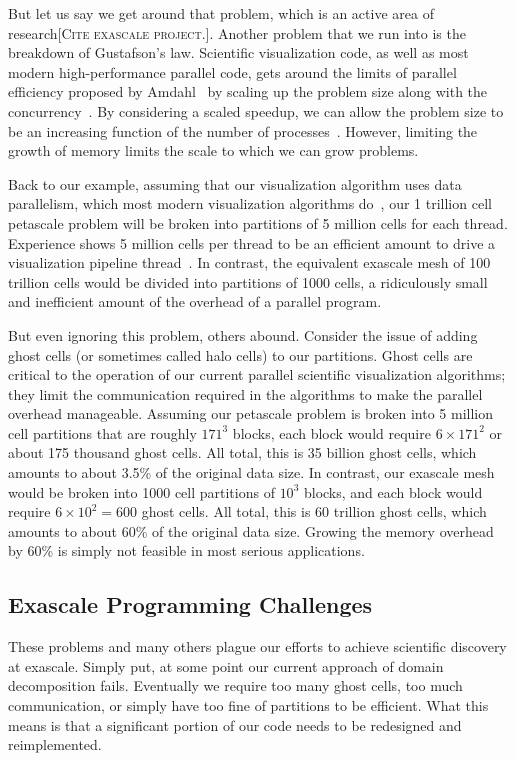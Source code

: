 \documentclass[conference]{IEEEtran}
\newcommand*{\lcite}[1]{~\cite{#1}}
\newcommand{\fix}[1]{{\color{red}\textsc{[#1]}}}
\begin{document}
But let us say we get around that problem, which is an active area of
research\fix{Cite exascale project.}.  Another problem that we run into is
the breakdown of Gustafson's law.  Scientific visualization code, as well
as most modern high-performance parallel code, gets around the limits of
parallel efficiency proposed by Amdahl\lcite{Amdahl1967} by scaling up the
problem size along with the concurrency\lcite{Gustafson1988}.  By
considering a scaled speedup, we can allow the problem size to be an
increasing function of the number of processes\lcite{Quinn2004}.  However,
limiting the growth of memory limits the scale to which we can grow
problems.

Back to our example, assuming that our visualization algorithm uses data
parallelism, which most modern visualization algorithms
do\lcite{Moreland2012:TVCG}, our 1 trillion cell petascale problem will be
broken into partitions of 5 million cells for each thread.  Experience
shows 5 million cells per thread to be an efficient amount to drive a
visualization pipeline thread\lcite{ParaViewTutorial}.  In contrast, the
equivalent exascale mesh of 100 trillion cells would be divided into
partitions of 1000 cells, a ridiculously small and inefficient amount of
the overhead of a parallel program.

But even ignoring this problem, others abound.  Consider the issue of
adding ghost cells (or sometimes called halo cells) to our partitions.
Ghost cells are critical to the operation of our current parallel
scientific visualization algorithms; they limit the communication required
in the algorithms to make the parallel overhead manageable.  Assuming our
petascale problem is broken into 5 million cell partitions that are roughly
$171^3$ blocks, each block would require $6 \times 171^2$ or about 175
thousand ghost cells.  All total, this is 35 billion ghost cells, which
amounts to about 3.5\% of the original data size.  In contrast, our
exascale mesh would be broken into 1000 cell partitions of $10^3$ blocks,
and each block would require $6 \times 10^2 = 600$ ghost cells.  All total,
this is 60 trillion ghost cells, which amounts to about 60\% of the
original data size.  Growing the memory overhead by 60\% is simply not
feasible in most serious applications.

\subsection{Exascale Programming Challenges}

\noindent
These problems and many others plague our efforts to achieve scientific
discovery at exascale.  Simply put, at some point our current approach of
domain decomposition fails.  Eventually we require too many ghost cells,
too much communication, or simply have too fine of partitions to be
efficient.  What this means is that a significant portion of our code needs
to be redesigned and reimplemented.
\end{document}
